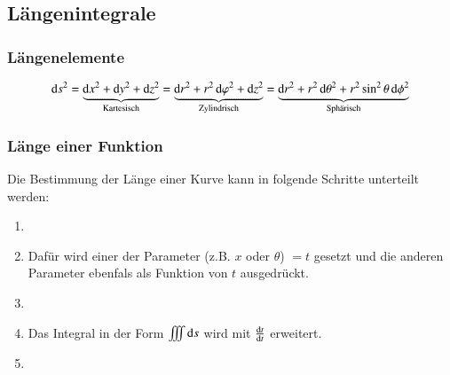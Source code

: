 \subsection{Längenintegrale}
\subsubsection{Längenelemente}\label{section:int_multivar:längenelemente}
$$
 \diff s^2 
    = \underbrace{\diff x^2 + \diff y^2 + \diff z^2}_{\text{Kartesisch}}
    = \underbrace{\diff r^2 + r^2 \diff \varphi^2 + \diff z^2}_{\text{Zylindrisch}}
    = \underbrace{\diff r^2 + r^2 \diff \theta^2 + r^2 \sin^2 \theta \diff \phi^2}_{\text{Sphärisch}}
$$
\subsubsection{Länge einer Funktion}
Die Bestimmung der Länge einer Kurve kann in folgende Schritte unterteilt werden:
\begin{enumerate}
    \item {}
    \item[] Dafür wird einer der Parameter (z.B. $x$ oder $\theta$) $=t$ gesetzt und die anderen Parameter ebenfals als Funktion von $t$ ausgedrückt.
    \item {}
    \item[] Das Integral in der Form $ \iiint \mathop{} \! \mathrm{d} s $ wird mit $\frac{\mathop{} \! \mathrm{d} t}{\mathop{} \! \mathrm{d} t}$ erweitert.
    \item {}
\end{enumerate}

